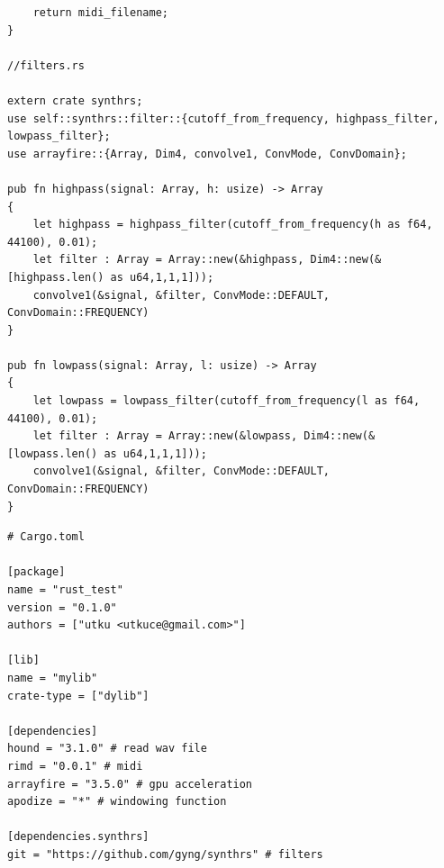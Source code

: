 \documentclass[a4paper,12pt]{report}
\begin{document}
\begin{verbatim}
    return midi_filename;
}

//filters.rs

extern crate synthrs;
use self::synthrs::filter::{cutoff_from_frequency, highpass_filter, lowpass_filter};
use arrayfire::{Array, Dim4, convolve1, ConvMode, ConvDomain};

pub fn highpass(signal: Array, h: usize) -> Array
{
    let highpass = highpass_filter(cutoff_from_frequency(h as f64, 44100), 0.01); 
    let filter : Array = Array::new(&highpass, Dim4::new(&[highpass.len() as u64,1,1,1]));
    convolve1(&signal, &filter, ConvMode::DEFAULT, ConvDomain::FREQUENCY)
}

pub fn lowpass(signal: Array, l: usize) -> Array
{
    let lowpass = lowpass_filter(cutoff_from_frequency(l as f64, 44100), 0.01);
    let filter : Array = Array::new(&lowpass, Dim4::new(&[lowpass.len() as u64,1,1,1]));
    convolve1(&signal, &filter, ConvMode::DEFAULT, ConvDomain::FREQUENCY)
}
\end{verbatim}
\newpage
\begin{verbatim}
# Cargo.toml

[package]
name = "rust_test"
version = "0.1.0"
authors = ["utku <utkuce@gmail.com>"]

[lib]
name = "mylib"
crate-type = ["dylib"]

[dependencies]
hound = "3.1.0" # read wav file
rimd = "0.0.1" # midi
arrayfire = "3.5.0" # gpu acceleration
apodize = "*" # windowing function

[dependencies.synthrs]
git = "https://github.com/gyng/synthrs" # filters
\end{verbatim}
\end{document}
